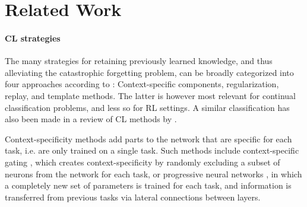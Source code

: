 \documentclass[dvipsnames]{article} %
\newcommand{\commentOLD}[1]{}
\newcommand{\saOLD}[1] {\commentOLD{{\color{cyan} SA: #1}}}                %
\newcommand{\jhOLD}[1] {\commentOLD{{\color{RawSienna} JH: #1}}}           %
\newcommand{\asOLD}[1] {\commentOLD{{\color{orange} AS: #1}}}              %
\begin{document}



\jhOLD{I don't know if this contradicts what SA and AS but what I would do is to state the area of this work very briefly in the introduction (you are already doing that) and then list the contributions. And then basically start from adam and eve (in terms of RL, but very briefly) i.e. DQN -> Continuous Spaces -> SAC, PPO -> Continual Learning (what is it) -> CL other methods; Mostly you are already doing that. But for example in the paragraph "a varienty of contiual learning".. you describe continual learning more like you would in related work (IMO). 
The reason for that is that the reviewers often do also not know a lot about the very specific field you are working on.
An example of this would be \url{https://arxiv.org/pdf/2206.03787.pdf} -- but this is also a personal taste thing.
SA-CHECK}
\section{Related Work} %
\paragraph{CL strategies} The many strategies for retaining previously learned knowledge, and thus alleviating the catastrophic forgetting problem, can be broadly categorized into four approaches according to \citet{threescenarios2}: Context-specific components, regularization, replay, and template methods. The latter is however most relevant for continual classification problems, and less so for RL settings. A similar classification has also been made in a review of CL methods by \citet{towardsCRL}.

Context-specificity methods add parts to the network that are specific for each task, i.e. are only trained on a single task. Such methods include context-specific gating \citep{xdg}, which creates context-specificity by randomly excluding a subset of neurons from the network for each task, or progressive neural networks \citep{pnn}, in which a completely new set of parameters is trained for each task, and information is transferred from previous tasks via lateral connections between layers.
\end{document}
